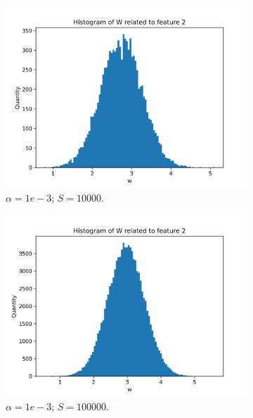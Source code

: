 \documentclass{article}
\begin{document}
\begin{figure}
\begin{subfigure}[t]{0.24\textwidth}
    \includegraphics[width=\linewidth]{hist_feat1_10000_sample_10000.png}
    \caption{$\alpha = 1e-3$; $S = 10000$.}
  \end{subfigure}
  \hfill
  \begin{subfigure}[t]{0.24\textwidth}
    \centering
    \includegraphics[width=\linewidth]{hist_feat1_10000_sample_100000.png}
    \caption{$\alpha = 1e-3$; $S = 100000$.}
  \end{subfigure}
  \begin{subfigure}[t]{0.24\textwidth}
    \centering

\end{subfigure}
\end{figure}
\end{document}
